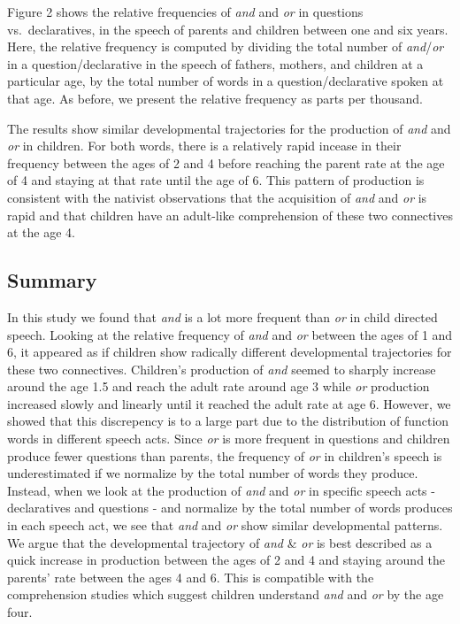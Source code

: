 \documentclass[10pt, letterpaper]{article}
\begin{document}
Figure 2 shows the relative frequencies of \emph{and} and \emph{or} in
questions vs.~declaratives, in the speech of parents and children
between one and six years. Here, the relative frequency is computed by
dividing the total number of \emph{and}/\emph{or} in a
question/declarative in the speech of fathers, mothers, and children at
a particular age, by the total number of words in a question/declarative
spoken at that age. As before, we present the relative frequency as
parts per thousand.

The results show similar developmental trajectories for the production
of \emph{and} and \emph{or} in children. For both words, there is a
relatively rapid incease in their frequency between the ages of 2 and 4
before reaching the parent rate at the age of 4 and staying at that rate
until the age of 6. This pattern of production is consistent with the
nativist observations that the acquisition of \emph{and} and \emph{or}
is rapid and that children have an adult-like comprehension of these two
connectives at the age 4.

\subsection{Summary}\label{summary}

In this study we found that \emph{and} is a lot more frequent than
\emph{or} in child directed speech. Looking at the relative frequency of
\emph{and} and \emph{or} between the ages of 1 and 6, it appeared as if
children show radically different developmental trajectories for these
two connectives. Children's production of \emph{and} seemed to sharply
increase around the age 1.5 and reach the adult rate around age 3 while
\emph{or} production increased slowly and linearly until it reached the
adult rate at age 6. However, we showed that this discrepency is to a
large part due to the distribution of function words in different speech
acts. Since \emph{or} is more frequent in questions and children produce
fewer questions than parents, the frequency of \emph{or} in children's
speech is underestimated if we normalize by the total number of words
they produce. Instead, when we look at the production of \emph{and} and
\emph{or} in specific speech acts - declaratives and questions - and
normalize by the total number of words produces in each speech act, we
see that \emph{and} and \emph{or} show similar developmental patterns.
We argue that the developmental trajectory of \emph{and} \& \emph{or} is
best described as a quick increase in production between the ages of 2
and 4 and staying around the parents' rate between the ages 4 and 6.
This is compatible with the comprehension studies which suggest children
understand \emph{and} and \emph{or} by the age four.
\end{document}
